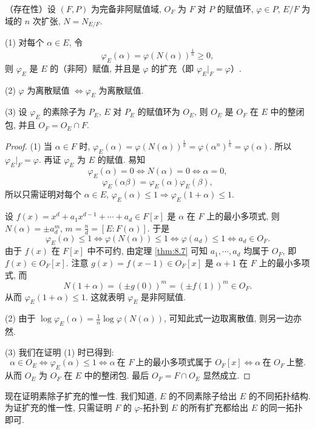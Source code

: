 \begin{theorem}\label{thm:8.13}
（存在性）设 $(F,P)$ 为完备非阿赋值域, $O_F$ 为 $F$ 对 $P$ 的赋值环, $\varphi\in P$, $E/F$ 为域的 $n$ 次扩张, $N=N_{E/F}$.

(1) 对每个 $\alpha\in E$, 令
\[
  \varphi_E(\alpha)=\varphi(N(\alpha))^{\frac{1}{n}}\geqslant 0,
\]
则 $\varphi_E$ 是 $E$ 的（非阿）赋值, 并且是 $\varphi$ 的扩充（即 $\varphi_E|_F=\varphi$）.

(2) $\varphi$ 为离散赋值 $\Leftrightarrow\varphi_E$ 为离散赋值.

(3) 设 $\varphi_E$ 的素除子为 $P_E$, $E$ 对 $P_E$ 的赋值环为 $O_E$, 则 $O_E$ 是 $O_F$ 在 $E$ 中的整闭包, 并且 $O_F=O_E\cap F$.
\end{theorem}

\begin{proof}
(1) 当 $\alpha\in F$ 时, $\varphi_E(\alpha)=\varphi(N(\alpha))^{\frac{1}{n}}=\varphi(\alpha^n)^{\frac{1}{n}}=\varphi(\alpha)$. 所以 $\varphi_E|_F=\varphi$. 再证 $\varphi_E$ 为 $E$ 的赋值. 易知
\[
  \varphi_E(\alpha)=0\Leftrightarrow N(\alpha)=0\Leftrightarrow\alpha=0,
\]
\[
  \varphi_E(\alpha\beta)=\varphi_E(\alpha)\varphi_E(\beta),
\]
所以只需证明对每个 $\alpha\in E$, $\varphi_E(\alpha)\leqslant 1\Rightarrow\varphi_E(1+\alpha)\leqslant 1$.

设 $f(x)=x^d+a_1x^{d-1}+\cdots+a_d\in F[x]$ 是 $\alpha$ 在 $F$ 上的最小多项式, 则 $N(\alpha)=\pm a_d^m$, $m=\frac{n}{d}=[E:F(\alpha)]$. 于是
\[
  \varphi_E(\alpha)\leqslant 1\Leftrightarrow\varphi(N(\alpha))\leqslant 1\Leftrightarrow\varphi(a_d)\leqslant 1\Leftrightarrow a_d\in O_F.
\]
由于 $f(x)$ 在 $F[x]$ 中不可约, 由定理 \ref{thm:8.7} 可知 $a_1,\cdots,a_d$ 均属于 $O_F$, 即 $f(x)\in O_F[x]$. 注意 $g(x)=f(x-1)\in O_F[x]$ 是 $\alpha+1$ 在 $F$ 上的最小多项式, 而
\[
  N(1+\alpha)=(\pm g(0))^m=(\pm f(1))^m\in O_F.
\]
从而 $\varphi_E(1+\alpha)\leqslant 1$. 这就表明 $\varphi_E$ 是非阿赋值.

(2) 由于 $\log\varphi_E(\alpha)=\frac{1}{n}\log\varphi(N(\alpha))$, 可知此式一边取离散值, 则另一边亦然.

(3) 我们在证明 (1) 时已得到:
\[
  \alpha\in O_E\Leftrightarrow\varphi_E(\alpha)\leqslant 1\Leftrightarrow\alpha\ \text{在 } F\ \text{上的最小多项式属于 } O_F[x]
  \Leftrightarrow\alpha\ \text{在 } O_F\ \text{上整}.
\]
从而 $O_E$ 为 $O_F$ 在 $E$ 中的整闭包. 最后 $O_F=F\cap O_E$ 显然成立.
\end{proof}

现在证明素除子扩充的惟一性. 我们知道, $E$ 的不同素除子给出 $E$ 的不同拓扑结构. 为证扩充的惟一性, 只需证明 $F$ 的 $\varphi$-拓扑到 $E$ 的所有扩充都给出 $E$ 的同一拓扑即可.

